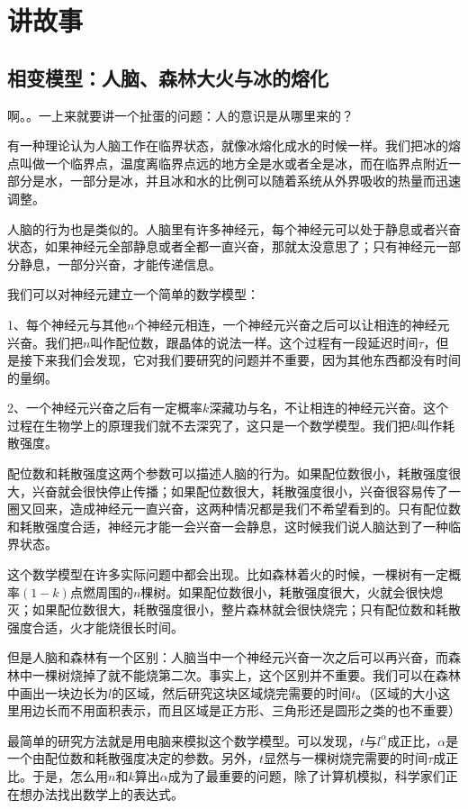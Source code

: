 \chapter{讲故事}
\section{相变模型：人脑、森林大火与冰的熔化}
啊。。一上来就要讲一个扯蛋的问题：人的意识是从哪里来的？

有一种理论认为人脑工作在临界状态，就像冰熔化成水的时候一样。我们把冰的熔点叫做一个临界点，温度离临界点远的地方全是水或者全是冰，而在临界点附近一部分是水，一部分是冰，并且冰和水的比例可以随着系统从外界吸收的热量而迅速调整。

人脑的行为也是类似的。人脑里有许多神经元，每个神经元可以处于静息或者兴奋状态，如果神经元全部静息或者全都一直兴奋，那就太没意思了；只有神经元一部分静息，一部分兴奋，才能传递信息。

我们可以对神经元建立一个简单的数学模型：

1、每个神经元与其他$n$个神经元相连，一个神经元兴奋之后可以让相连的神经元兴奋。我们把$n$叫作配位数，跟晶体的说法一样。这个过程有一段延迟时间$\tau$，但是接下来我们会发现，它对我们要研究的问题并不重要，因为其他东西都没有时间的量纲。

2、一个神经元兴奋之后有一定概率$k$深藏功与名，不让相连的神经元兴奋。这个过程在生物学上的原理我们就不去深究了，这只是一个数学模型。我们把$k$叫作耗散强度。

配位数和耗散强度这两个参数可以描述人脑的行为。如果配位数很小，耗散强度很大，兴奋就会很快停止传播；如果配位数很大，耗散强度很小，兴奋很容易传了一圈又回来，造成神经元一直兴奋，这两种情况都是我们不希望看到的。只有配位数和耗散强度合适，神经元才能一会兴奋一会静息，这时候我们说人脑达到了一种临界状态。

这个数学模型在许多实际问题中都会出现。比如森林着火的时候，一棵树有一定概率$(1-k)$点燃周围的$n$棵树。如果配位数很小，耗散强度很大，火就会很快熄灭；如果配位数很大，耗散强度很小，整片森林就会很快烧完；只有配位数和耗散强度合适，火才能烧很长时间。

但是人脑和森林有一个区别：人脑当中一个神经元兴奋一次之后可以再兴奋，而森林中一棵树烧掉了就不能烧第二次。事实上，这个区别并不重要。我们可以在森林中画出一块边长为$l$的区域，然后研究这块区域烧完需要的时间$t$。（区域的大小这里用边长而不用面积表示，而且区域是正方形、三角形还是圆形之类的也不重要）

最简单的研究方法就是用电脑来模拟这个数学模型。可以发现，$t$与$l^{\alpha}$成正比，$\alpha$是一个由配位数和耗散强度决定的参数。另外，$t$显然与一棵树烧完需要的时间$\tau$成正比。于是，怎么用$n$和$k$算出$\alpha$成为了最重要的问题，除了计算机模拟，科学家们正在想办法找出数学上的表达式。

